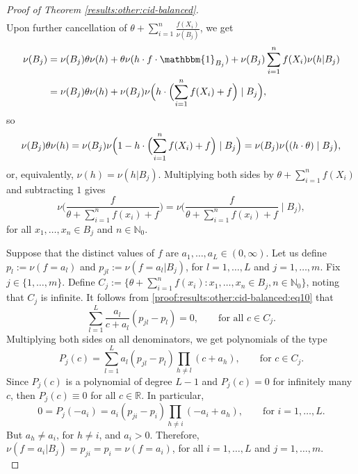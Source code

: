 \documentclass[a4paper]{article}
\theoremstyle{plain}
\theoremstyle{remark}
\theoremstyle{definition}
\begin{document}
\begin{proof}[Proof of Theorem \ref{results:other:cid-balanced}]
\begin{align*}
\end{align*}
\endgroup
Upon further cancellation of $\theta+\sum_{i=1}^n\frac{f(X_i)}{\nu(B_j)}$, we get
\begingroup\allowdisplaybreaks
\begin{align*}
\nu(B_j)&=\nu(B_j)\theta\nu(h)+\theta\nu(h\cdot f\cdot\mathbbm{1}_{B_j})+\nu(B_j)\sum_{i=1}^nf(X_i)\nu(h|B_j)\\
&=\nu(B_j)\theta\nu(h)+\nu(B_j)\nu\Bigl(h\cdot\Bigl(\sum_{i=1}^nf(X_i)+f\Bigr)\mid B_j\Bigr),
\end{align*}
\endgroup
so
\[\nu(B_j)\theta\nu(h)=\nu(B_j)\nu\Bigl(1-h\cdot\Bigl(\sum_{i=1}^nf(X_i)+f\Bigr)\mid B_j\Bigr)=\nu(B_j)\nu\bigl((h\cdot\theta)\mid B_j\bigr),\]
or, equivalently, $\nu(h)=\nu(h|B_j)$. Multiplying both sides by $\theta+\sum_{i=1}^nf(X_i)$ and subtracting $1$ gives
\begin{equation}\label{proof:results:other:cid-balanced:eq10}
\nu\biggl(\frac{f}{\theta+\sum_{i=1}^nf(x_i)+f}\biggr)=\nu\biggl(\frac{f}{\theta+\sum_{i=1}^nf(x_i)+f}\mid B_j\biggr),
\end{equation}
for all $x_1,\ldots,x_n\in B_j$ and $n\in\mathbb{N}_0$.

Suppose that the distinct values of $f$ are $a_1,\ldots,a_L\in(0,\infty)$. Let us define $p_l:=\nu(f=a_l)$ and $p_{jl}:=\nu(f=a_l|B_j)$, for $l=1,\ldots,L$ and $j=1,\ldots,m$. Fix $j\in\{1,\ldots,m\}$. Define $C_j:=\{\theta+\sum_{i=1}^nf(x_i):x_1,\ldots,x_n\in B_j,n\in\mathbb{N}_0\}$, noting that $C_j$ is infinite. It follows from \eqref{proof:results:other:cid-balanced:eq10} that
\[\sum_{l=1}^L\frac{a_l}{c+a_l}(p_{jl}-p_l)=0,\qquad\mbox{for all }c\in C_j.\]
Multiplying both sides on all denominators, we get polynomials of the type
\begin{equation}\label{proof:results:other:cid-balanced:eq11}
P_j(c)=\sum_{l=1}^La_l(p_{jl}-p_l)\prod_{h\neq l}(c+a_h),\qquad\mbox{for }c\in C_j.
\end{equation}
Since $P_j(c)$ is a polynomial of degree $L-1$ and $P_j(c)=0$ for infinitely many $c$, then $P_j(c)\equiv 0$ for all $c\in\mathbb{R}$. In particular,
\[0=P_j(-a_i)=a_i(p_{ji}-p_i)\prod_{h\neq i}(-a_i+a_h),\qquad\mbox{for }i=1,\ldots,L.\]
But $a_h\neq a_i$, for $h\neq i$, and $a_i>0$. Therefore, $\nu(f=a_i|B_j)=p_{ji}=p_i=\nu(f=a_i)$, for all $i=1,\ldots,L$ and $j=1,\ldots,m$.\\


\end{proof}
\end{document}
